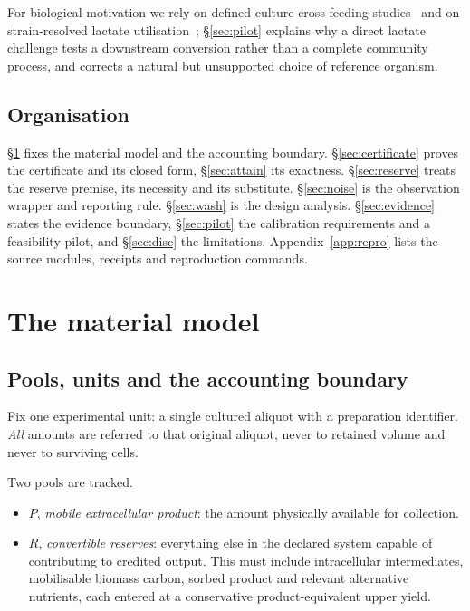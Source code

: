 \documentclass[11pt]{article}
\theoremstyle{plain}
\theoremstyle{definition}
\theoremstyle{remark}
\begin{document}
For biological motivation we rely on defined-culture cross-feeding
studies~\cite{belenguer} and on strain-resolved lactate
utilisation~\cite{duncan,munoz}; \S\ref{sec:pilot} explains why a direct
lactate challenge tests a downstream conversion rather than a complete
community process, and corrects a natural but unsupported choice of reference
organism.

\subsection{Organisation}
\S\ref{sec:model} fixes the material model and the accounting boundary.
\S\ref{sec:certificate} proves the certificate and its closed form,
\S\ref{sec:attain} its exactness. \S\ref{sec:reserve} treats the reserve
premise, its necessity and its substitute. \S\ref{sec:noise} is the
observation wrapper and reporting rule. \S\ref{sec:wash} is the design
analysis. \S\ref{sec:evidence} states the evidence boundary,
\S\ref{sec:pilot} the calibration requirements and a feasibility pilot, and
\S\ref{sec:disc} the limitations. Appendix~\ref{app:repro} lists the source
modules, receipts and reproduction commands.

\section{The material model}\label{sec:model}

\subsection{Pools, units and the accounting boundary}

Fix one experimental unit: a single cultured aliquot with a preparation
identifier. \emph{All} amounts are referred to that original aliquot, never to
retained volume and never to surviving cells.

Two pools are tracked.
\begin{itemize}
\item $P$, \emph{mobile extracellular product}: the amount physically
available for collection.
\item $R$, \emph{convertible reserves}: everything else in the declared system
capable of contributing to credited output. This must include intracellular
intermediates, mobilisable biomass carbon, sorbed product and relevant
alternative nutrients, each entered at a conservative product-equivalent upper
yield.
\end{itemize}
\end{document}
